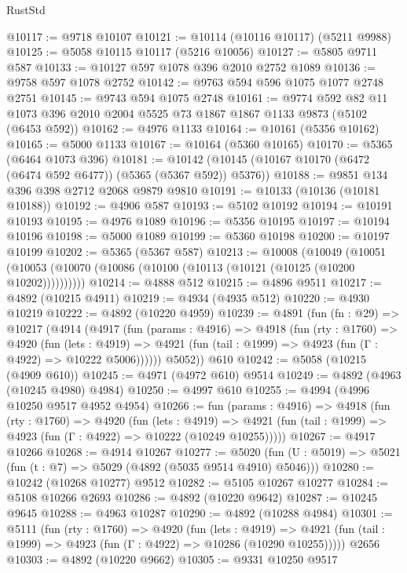 \begin{lexlean}{RustStd}
\begin{coremodule}
@10117 := @9718 @10107
@10121 := @10114 (@10116 @10117) (@5211 @9988)
@10125 := @5058 @10115 @10117 (@5216 @10056)
@10127 := @5805 @9711 @587
@10133 := @10127 @597 @1078 @396 @2010 @2752 @1089
@10136 := @9758 @597 @1078 @2752
@10142 := @9763 @594 @596 @1075 @1077 @2748 @2751
@10145 := @9743 @594 @1075 @2748
@10161 := @9774
    @592
    @82
    @11
    @1073
    @396
    @2010
    @2004
    @5525
    @73
    @1867
    @1867
    @1133
    @9873
    (@5102 (@6453 @592))
@10162 := @4976 @1133
@10164 := @10161 (@5356 @10162)
@10165 := @5000 @1133
@10167 := @10164 (@5360 @10165)
@10170 := @5365 (@6464 @1073 @396)
@10181 := @10142 (@10145 (@10167 @10170 (@6472 (@6474 @592 @6477)) (@5365 (@5367 @592)) @5376))
@10188 := @9851 @134 @396 @398 @2712 @2068 @9879 @9810
@10191 := @10133 (@10136 (@10181 @10188))
@10192 := @4906 @587
@10193 := @5102 @10192
@10194 := @10191 @10193
@10195 := @4976 @1089
@10196 := @5356 @10195
@10197 := @10194 @10196
@10198 := @5000 @1089
@10199 := @5360 @10198
@10200 := @10197 @10199
@10202 := @5365 (@5367 @587)
@10213 := @10008
    (@10049 (@10051 (@10053 (@10070 (@10086 (@10100 (@10113 (@10121 (@10125 (@10200 @10202))))))))))
@10214 := @4888 @512
@10215 := @4896 @9511
@10217 := @4892 (@10215 @4911)
@10219 := @4934 (@4935 @512)
@10220 := @4930 @10219
@10222 := @4892 (@10220 @4959)
@10239 := @4891
    (fun (fn : @29) =>
    @10217
      (@4914
        (@4917
          (fun (params : @4916) =>
          @4918
            (fun (rty : @1760) =>
            @4920
              (fun (lets : @4919) =>
              @4921 (fun (tail : @1999) => @4923 (fun (Γ : @4922) => @10222 @5006))))))
        @5052))
    @610
@10242 := @5058 (@10215 (@4909 @610))
@10245 := @4971 (@4972 @610) @9514
@10249 := @4892 (@4963 (@10245 @4980) @4984)
@10250 := @4997 @610
@10255 := @4994 (@4996 @10250 @9517 @4952 @4954)
@10266 := fun (params : @4916) =>
  @4918
    (fun (rty : @1760) =>
    @4920
      (fun (lets : @4919) =>
      @4921 (fun (tail : @1999) => @4923 (fun (Γ : @4922) => @10222 (@10249 @10255)))))
@10267 := @4917 @10266
@10268 := @4914 @10267
@10277 := @5020 (fun (U : @5019) => @5021 (fun (t : @7) => @5029 (@4892 (@5035 @9514 @4910) @5046)))
@10280 := @10242 (@10268 @10277) @9512
@10282 := @5105 @10267 @10277
@10284 := @5108 @10266 @2693
@10286 := @4892 (@10220 @9642)
@10287 := @10245 @9645
@10288 := @4963 @10287
@10290 := @4892 (@10288 @4984)
@10301 := @5111
    (fun (rty : @1760) =>
    @4920
      (fun (lets : @4919) =>
      @4921 (fun (tail : @1999) => @4923 (fun (Γ : @4922) => @10286 (@10290 @10255)))))
    @2656
@10303 := @4892 (@10220 @9662)
@10305 := @9331 @10250 @9517

\end{coremodule}
\end{lexlean}
